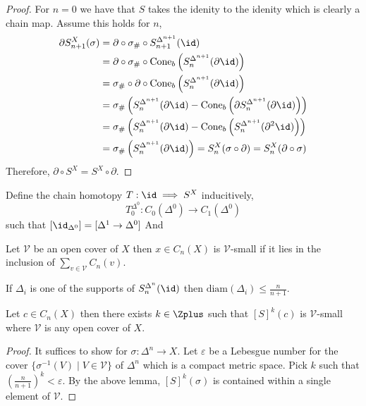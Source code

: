 \documentclass[12pt]{extarticle}
\begin{document}
\begin{proof}
For $n = 0$ we have that $S$ takes the idenity to the idenity which is clearly a chain map. Assume this holds for $n$,
\begin{align*}
\partial S_{n+1}^X(\sigma) & = \partial \circ \sigma_{\#} \circ S^{\Delta^{n+1}}_{n+1}(\id)  
\\
& = \partial \circ \sigma_{\#} \circ \cone_b\left( S^{\Delta^{n+1}}_n (\partial \id) \right) 
\\
& = \sigma_{\#} \circ \partial \circ \cone_b\left( S^{\Delta^{n+1}}_n (\partial \id) \right) 
\\
& = \sigma_{\#} \left( S^{\Delta^{n+1}}_n(\partial \id) - \cone_b \left(\partial S^{\Delta^{n+1}}_n (\partial \id) \right) \right)
\\
& = \sigma_{\#} \left( S^{\Delta^{n+1}}_n(\partial \id) - \cone_b \left( S^{\Delta^{n+1}}_n (\partial^2 \id) \right) \right)
\\
& = \sigma_{\#} \left( S^{\Delta^{n+1}}_n(\partial \id) \right) = S_{n}^{X}(\sigma \circ \partial) = S_{n}^{X}(\partial \circ \sigma)
\end{align*}
Therefore, $\partial \circ S^X = S^X \circ \partial$. 
\end{proof}

\begin{definition}
Define the chain homotopy $T : \id \implies S^X$ inducitively,
\[ T_0^{\Delta^0} : C_0(\Delta^0) \to C_1(\Delta^0)\] such that $ [\id_{\Delta^0}] = [\Delta^1 \to \Delta^0] $
And
\end{definition}

\begin{definition}
Let $\mathcal{V}$ be an open cover of $X$ then $x \in C_n(X)$ is $\mathcal{V}$-small if it lies in the inclusion of $\sum_{v \in \mathcal{V}} C_n(v)$.
\end{definition}

\begin{lemma}
If $\Delta_i$ is one of the supports of $S^{\Delta^n}_n(\id)$ then $\mathrm{diam}(\Delta_i) \le \frac{n}{n+1}$.
\end{lemma}

\begin{lemma}
Let $c \in C_n(X)$ then there exists $k \in \Zplus$ such that $[S]^k(c)$ is $\mathcal{V}$-small where $\mathcal{V}$ is any open cover of $X$. 
\end{lemma}

\begin{proof}
It suffices to show for $\sigma : \Delta^n \to X$. Let $\varepsilon$ be a Lebesgue number for the cover $\{ \sigma^{-1}(V) \mid V \in \mathcal{V} \}$ of $\Delta^n$ which is a compact metric space. Pick $k$ such that $\left(\frac{n}{n+1}\right)^k < \varepsilon$. By the above lemma, $[S]^k(\sigma)$ is contained within a single element of $\mathcal{V}$. 
\end{proof}
\end{document}
